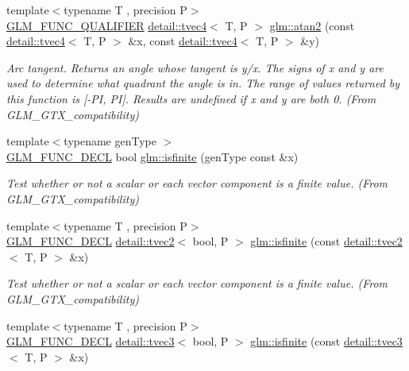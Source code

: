 \begin{DoxyCompactItemize}
{\footnotesize template$<$typename T , precision P$>$ }\\\hyperlink{setup_8hpp_a33fdea6f91c5f834105f7415e2a64407}{G\+L\+M\+\_\+\+F\+U\+N\+C\+\_\+\+Q\+U\+A\+L\+I\+F\+I\+ER} \hyperlink{structglm_1_1detail_1_1tvec4}{detail\+::tvec4}$<$ T, P $>$ \hyperlink{group__gtx__compatibility_ga3b9f0577d1b5d76c0f6ab04e28599fc4}{glm\+::atan2} (const \hyperlink{structglm_1_1detail_1_1tvec4}{detail\+::tvec4}$<$ T, P $>$ \&x, const \hyperlink{structglm_1_1detail_1_1tvec4}{detail\+::tvec4}$<$ T, P $>$ \&y)
\begin{DoxyCompactList}\small\item\em Arc tangent. Returns an angle whose tangent is y/x. The signs of x and y are used to determine what quadrant the angle is in. The range of values returned by this function is \mbox{[}-\/\+PI, PI\mbox{]}. Results are undefined if x and y are both 0. (From G\+L\+M\+\_\+\+G\+T\+X\+\_\+compatibility) \end{DoxyCompactList}\item 
{\footnotesize template$<$typename gen\+Type $>$ }\\\hyperlink{setup_8hpp_ab2d052de21a70539923e9bcbf6e83a51}{G\+L\+M\+\_\+\+F\+U\+N\+C\+\_\+\+D\+E\+CL} bool \hyperlink{group__gtx__compatibility_gaf4b04dcd3526996d68c1bfe17bfc8657}{glm\+::isfinite} (gen\+Type const \&x)
\begin{DoxyCompactList}\small\item\em Test whether or not a scalar or each vector component is a finite value. (From G\+L\+M\+\_\+\+G\+T\+X\+\_\+compatibility) \end{DoxyCompactList}\item 
{\footnotesize template$<$typename T , precision P$>$ }\\\hyperlink{setup_8hpp_ab2d052de21a70539923e9bcbf6e83a51}{G\+L\+M\+\_\+\+F\+U\+N\+C\+\_\+\+D\+E\+CL} \hyperlink{structglm_1_1detail_1_1tvec2}{detail\+::tvec2}$<$ bool, P $>$ \hyperlink{group__gtx__compatibility_ga604f38239da3a5b5b1e4fe06dec7f64d}{glm\+::isfinite} (const \hyperlink{structglm_1_1detail_1_1tvec2}{detail\+::tvec2}$<$ T, P $>$ \&x)
\begin{DoxyCompactList}\small\item\em Test whether or not a scalar or each vector component is a finite value. (From G\+L\+M\+\_\+\+G\+T\+X\+\_\+compatibility) \end{DoxyCompactList}\item 
{\footnotesize template$<$typename T , precision P$>$ }\\\hyperlink{setup_8hpp_ab2d052de21a70539923e9bcbf6e83a51}{G\+L\+M\+\_\+\+F\+U\+N\+C\+\_\+\+D\+E\+CL} \hyperlink{structglm_1_1detail_1_1tvec3}{detail\+::tvec3}$<$ bool, P $>$ \hyperlink{group__gtx__compatibility_ga416b6078bffd22e3a56a5c5379ba2cf8}{glm\+::isfinite} (const \hyperlink{structglm_1_1detail_1_1tvec3}{detail\+::tvec3}$<$ T, P $>$ \&x)

\end{DoxyCompactItemize}
